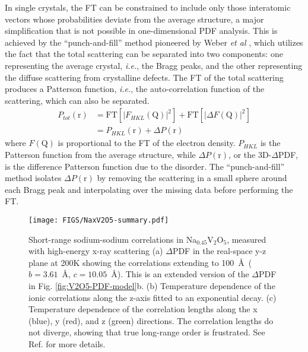 In single crystals, the FT can be constrained to include only those interatomic
vectors whose probabilities deviate from the average structure, a major
simplification that is not possible in one-dimensional PDF analysis. This is achieved
by the ``punch-and-fill'' method pioneered by Weber \emph{et al} \cite{Weber:2012en},
which utilizes the fact that the total scattering can be separated into two
components: one representing the average crystal, \textit{i.e.}, the Bragg peaks, and
the other representing the diffuse scattering from crystalline defects. The FT of the
total scattering produces a Patterson function, \textit{i.e.}, the auto-correlation
function of the scattering, which can also be separated.
\begin{equation}
\begin{split}
P_{tot}(\boldsymbol{\mathrm{r}})&=\mathrm{FT}[|F_{H\! K\!
L}(\boldsymbol{\mathrm{Q}})|^2]+\mathrm{FT}[|\Delta F(\boldsymbol{\mathrm{Q}})|^2] \\
&=P_{H\! K\! L}(\boldsymbol{\mathrm{r}})+\Delta P(\boldsymbol{\mathrm{r}})
\end{split}
\end{equation}
where $F(\boldsymbol{\mathrm{Q}})$ is proportional to the FT of the electron density.
$P_{H\! K\! L}$ is the Patterson function from the average structure, while $\Delta
P(\boldsymbol{\mathrm{r}})$, or the 3D-$\Delta$PDF, is the difference Patterson
function due to the disorder. The ``punch-and-fill'' method isolates $\Delta
P(\boldsymbol{\mathrm{r}})$ by removing the scattering in a small sphere around each
Bragg peak and interpolating over the missing data before performing the FT. 

\begin{figure}[!t]
\begin{center}
\texttt{[image: FIGS/NaxV2O5-summary.pdf]}
\caption{\label{fig:NaxV2O5-summary} Short-range sodium-sodium correlations in
Na$_{0.45}$V$_2$O$_5$, measured with high-energy x-ray scattering
\cite{Krogstad:2019tc} (a) $\Delta$PDF in the real-space y-z plane at 200K showing
the correlations extending to 100~\AA\ ($b=3.61$~\AA, $c=10.05$~\AA). This is an
extended version of the $\Delta$PDF in Fig. \ref{fig:V2O5-PDF-model}b. (b)
Temperature dependence of the ionic correlations along the z-axis fitted to an
exponential decay. (c) Temperature dependence of the correlation lengths along the x
(blue), y (red), and z (green) directions. The correlation lengths do not diverge,
showing that true long-range order is frustrated. See Ref. \cite{Krogstad:2019tc} for
more details.}
\end{center}
\end{figure}


